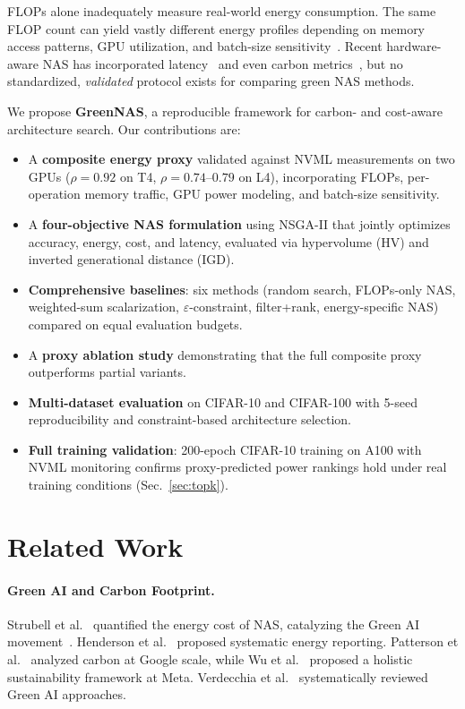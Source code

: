 \documentclass[10pt,twocolumn,letterpaper]{article}
\begin{document}
FLOPs alone inadequately measure real-world energy consumption. The same FLOP count can yield vastly different energy profiles depending on memory access patterns, GPU utilization, and batch-size sensitivity~\cite{garcia2019estimation,chung2023zeus}. Recent hardware-aware NAS has incorporated latency~\cite{tan2019mnasnet,cai2019proxylessnas,wu2019fbnet,cai2020onceforall} and even carbon metrics~\cite{zhao2024cenas}, but no standardized, \emph{validated} protocol exists for comparing green NAS methods.

We propose \textbf{GreenNAS}, a reproducible framework for carbon- and cost-aware architecture search. Our contributions are:
\begin{itemize}[leftmargin=*,nosep]
\item A \textbf{composite energy proxy} validated against NVML measurements on two GPUs ($\rho = 0.92$ on T4, $\rho = 0.74$--$0.79$ on L4), incorporating FLOPs, per-operation memory traffic, GPU power modeling, and batch-size sensitivity.
\item A \textbf{four-objective NAS formulation} using NSGA-II that jointly optimizes accuracy, energy, cost, and latency, evaluated via hypervolume (HV) and inverted generational distance (IGD).
\item \textbf{Comprehensive baselines}: six methods (random search, FLOPs-only NAS, weighted-sum scalarization, $\varepsilon$-constraint, filter+rank, energy-specific NAS) compared on equal evaluation budgets.
\item A \textbf{proxy ablation study} demonstrating that the full composite proxy outperforms partial variants.
\item \textbf{Multi-dataset evaluation} on CIFAR-10 and CIFAR-100 with 5-seed reproducibility and constraint-based architecture selection.
\item \textbf{Full training validation}: 200-epoch CIFAR-10 training on A100 with NVML monitoring confirms proxy-predicted power rankings hold under real training conditions (Sec.~\ref{sec:topk}).
\end{itemize}

\section{Related Work}
\label{sec:related}

\paragraph{Green AI and Carbon Footprint.}
Strubell et al.~\cite{strubell2019energy} quantified the energy cost of NAS, catalyzing the Green AI movement~\cite{schwartz2020green}. Henderson et al.~\cite{henderson2020systematic} proposed systematic energy reporting. Patterson et al.~\cite{patterson2021carbon} analyzed carbon at Google scale, while Wu et al.~\cite{wu2022sustainable} proposed a holistic sustainability framework at Meta. Verdecchia et al.~\cite{verdecchia2023systematic} systematically reviewed Green AI approaches.
\end{document}
